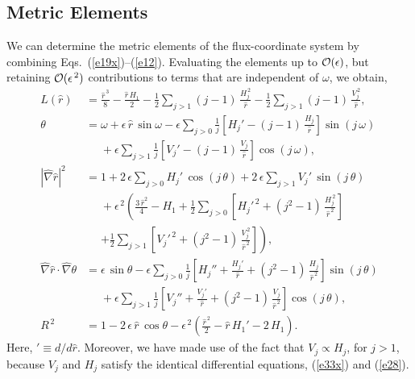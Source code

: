 \documentclass[12pt,prb,aps]{revtex4-1}
\begin{document}
\subsection{Metric Elements}\label{metric}
We can determine the metric elements of the flux-coordinate system by combining Eqs.~(\ref{e19x})--(\ref{e12}).
Evaluating the elements up to ${\cal O}(\epsilon)$, but retaining ${\cal O}(\epsilon^{\,2})$ contributions to terms that are independent of
$\omega$, we obtain,\cite{am1,gim,fitz2024}
\begin{align}\label{epdef}
L(\hat{r})&= \frac{\hat{r}^{\,3}}{8} -\frac{\hat{r}\,H_1}{2}-\frac{1}{2}\sum_{j>1}(j-1)\,\frac{H_j^{\,2}}{\hat{r}}
-\frac{1}{2}\sum_{j>1}(j-1)\,\frac{V_j^{\,2}}{\hat{r}},\\[0.5ex]
\theta &= \omega+\epsilon\,\hat{r}\,\sin\omega - \epsilon\sum_{j>0}\frac{1}{j}\left[H_j'-(j-1)\,\frac{H_j}{\hat{r}}\right]\sin(j\,\omega)
\nonumber\\[0.5ex]&\phantom{=}+ \epsilon\sum_{j>1}\frac{1}{j}\left[V_j'-(j-1)\,\frac{V_j}{\hat{r}}\right]\cos(j\,\omega),\label{e22y}\\[0.5ex]
|\hat{\nabla} \hat{r}|^2 &= 1 +2\,\epsilon\sum_{j>0}H_j'\,\cos(j\,\theta) +2\,\epsilon\sum_{j>1}V_j'\,\sin(j\,\theta) \nonumber\\[0.5ex]
&\phantom{=}+\epsilon^{\,2}\left(\frac{3\,\hat{r}^2}{4}-H_1+
\frac{1}{2}\sum_{j>0}\left[H_j'^{\,2}+(j^2-1)\,\frac{H_j^{\,2}}{\hat{r}^{\,2}}\right]\right.\nonumber\\[0.5ex]&\phantom{=}\left.+
\frac{1}{2}\sum_{j>1}\left[V_j'^{\,2}+(j^2-1)\,\frac{V_j^{\,2}}{\hat{r}^{\,2}}\right]
\right),\label{e19}\\[0.5ex]
\hat{\nabla}\hat{r}\cdot\hat{\nabla}\theta&=\epsilon\,\sin\theta
-\epsilon\sum_{j>0}\frac{1}{j}\left[H_j''+\frac{H_j'}{\hat{r}}+(j^2-1)\,\frac{H_j}{\hat{r}^{\,2}}\right]\sin(j\,\theta)\nonumber\\[0.5ex]&
\phantom{=}+\epsilon\sum_{j>1}\frac{1}{j}\left[V_j''+\frac{V_j'}{\hat{r}}+(j^2-1)\,\frac{V_j}{\hat{r}^{\,2}}\right]\cos(j\,\theta),
\\[0.5ex]
R^{\,2}&= 1-2\,\epsilon\,\hat{r}\,\cos\theta -\epsilon^{\,2}\left(\frac{\hat{r}^{\,2}}{2}-\hat{r}\,H_1'-2\,H_1\right).\label{e25a}
\end{align}
Here, $'\equiv d/d\hat{r}$. Moreover, we have made use of the fact that $V_j\propto H_j$, for $j>1$, because
$V_j$ and $H_j$ satisfy the identical differential equations, (\ref{e33x}) and (\ref{e28}). 
\end{document}
